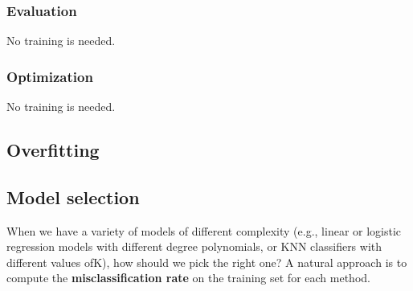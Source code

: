 \subsubsection{Evaluation}
No training is needed.

\subsubsection{Optimization}
No training is needed.


\subsection{Overfitting}


\subsection{Model selection}
When we have a variety of models of different complexity (e.g., linear or logistic regression models with different degree polynomials, or KNN classifiers with different values ofK), how should we pick the right one? A natural approach is to compute the \textbf{misclassification rate} on the training set for each method.


